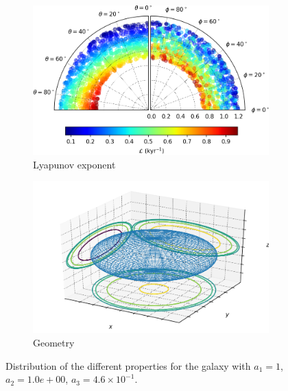 \begin{figure}[h]
\begin{subfigure}[t]{0.4\textwidth}
        \includegraphics[width=\textwidth]{"../Files/Week 13/images/20_lyapunov"}
        \caption{Lyapunov exponent}
    \end{subfigure}
    \begin{subfigure}[t]{0.4\textwidth}
        \includegraphics[width=\textwidth]{"../Files/Week 13/images/20_ellipsoid"}
        \caption{Geometry}
    \end{subfigure}
    \caption{Distribution of the different properties for the galaxy with $a_1 = 1$, $a_2 = 1.0e+00$, $a_3 = 4.6\times10^{-1}$.}
    \label{fig: g1}
\end{figure}



